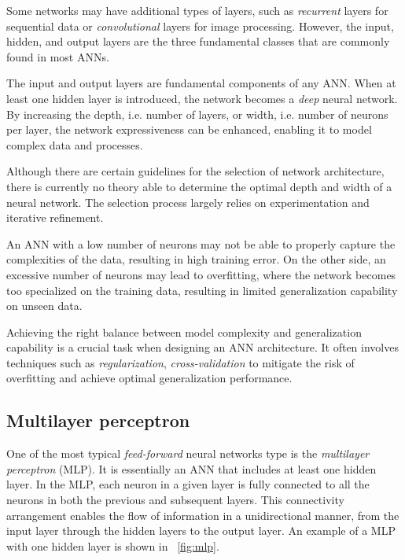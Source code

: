 Some networks may have additional types of layers, such as \textit{recurrent} layers for sequential data or \textit{convolutional} layers for image processing. However, the input, hidden, and output layers are the three fundamental classes that are commonly found in most ANNs.

The input and output layers are fundamental components of any ANN. When at least one hidden layer is introduced, the network becomes a \textit{deep} neural network. By increasing the depth, i.e. number of layers, or width, i.e. number of neurons per layer, the network expressiveness can be enhanced, enabling it to model complex data and processes.

Although there are certain guidelines for the selection of network architecture, there is currently no theory able to determine the optimal depth and width of a neural network. The selection process largely relies on experimentation and iterative refinement.

An ANN with a low number of neurons may not be able to properly capture the complexities of the data, resulting in high training error. On the other side, an excessive number of neurons may lead to overfitting, where the network becomes too specialized on the training data, resulting in limited generalization capability on unseen data.

Achieving the right balance between model complexity and generalization capability is a crucial task when designing an ANN architecture. It often involves techniques such as \textit{regularization}, \textit{cross-validation} to mitigate the risk of overfitting and achieve optimal generalization performance.

\subsection{Multilayer perceptron}

One of the most typical \textit{feed-forward} neural networks type is the \textit{multilayer perceptron} (MLP). It is essentially an ANN that includes at least one hidden layer. In the MLP, each neuron in a given layer is fully connected to all the neurons in both the previous and subsequent layers. This connectivity arrangement enables the flow of information in a unidirectional manner, from the input layer through the hidden layers to the output layer.  An example of a MLP with one hidden layer is shown in \Fig~\ref{fig:mlp}.

